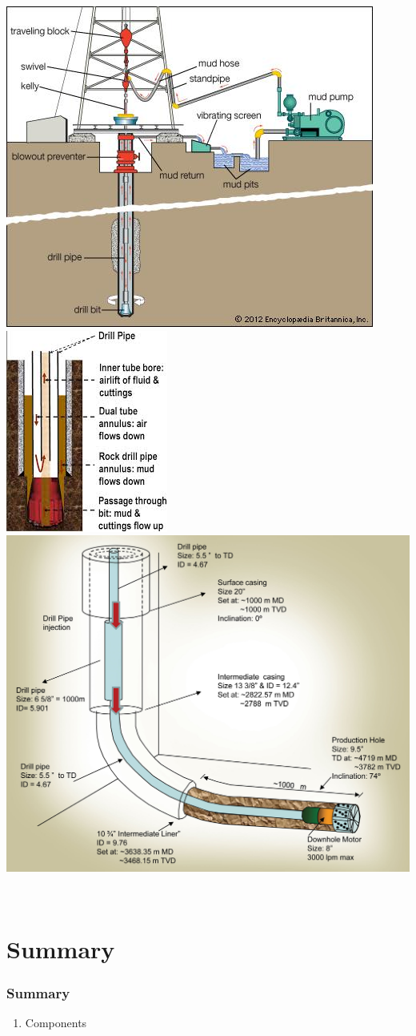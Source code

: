 \documentclass[10pt,compress]{beamer}
\begin{document}
\begin{frame}
\begin{columns}
\begin{column}[l]{0.55\linewidth}
{{             \includegraphics[width=0.5\columnwidth,clip]{./Pics/Drilling.jpg}
          }
          \hbox{
             \includegraphics[width=0.35\columnwidth,clip]{./Pics/DTRC_Diagram.jpg}\hspace{.53cm}
             \includegraphics[width=0.55\columnwidth,clip]{./Pics/web_Drillpipe_injection_well_profile-copy.jpg}
          }
       }
    \end{column}
  \end{columns}
\end{frame}
 


\section{Summary}
\begin{frame}
 \frametitle{Summary}
  \begin{enumerate}
%
     \item <1-> Components 
%
  \end{enumerate}
\end{frame}
\end{document}
